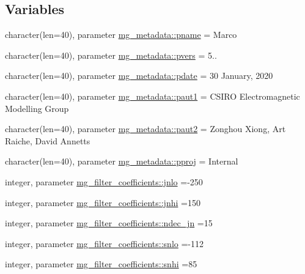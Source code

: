 \subsection*{Variables}
\begin{DoxyCompactItemize}
\item 
character(len=40), parameter \hyperlink{namespacemg__metadata_ad684795e52fbc1cdd49b371b212a9e80}{mg\+\_\+metadata\+::pname} = \textquotesingle{}Marco\textquotesingle{}
\item 
character(len=40), parameter \hyperlink{namespacemg__metadata_a12335b83f4d2c57e111fad11368698d3}{mg\+\_\+metadata\+::pvers} = \textquotesingle{}5..\textquotesingle{}
\item 
character(len=40), parameter \hyperlink{namespacemg__metadata_a4106e803f80dc8c6ab3c50695fb54f5d}{mg\+\_\+metadata\+::pdate} = \textquotesingle{}30 January, 2020\textquotesingle{}
\item 
character(len=40), parameter \hyperlink{namespacemg__metadata_a110dfe842cce52440d80ec88e87c5c17}{mg\+\_\+metadata\+::paut1} = \textquotesingle{}C\+S\+I\+RO Electromagnetic Modelling Group\textquotesingle{}
\item 
character(len=40), parameter \hyperlink{namespacemg__metadata_a57994bf5e2ca111728f864404d2819bd}{mg\+\_\+metadata\+::paut2} = \textquotesingle{}Zonghou Xiong, Art Raiche, David Annetts\textquotesingle{}
\item 
character(len=40), parameter \hyperlink{namespacemg__metadata_afefd0fba4ecb62a3ed3c8dcfd479c2d7}{mg\+\_\+metadata\+::pproj} = \textquotesingle{}Internal\textquotesingle{}
\item 
integer, parameter \hyperlink{namespacemg__filter__coefficients_a610240075eb5a7a6edf1336aceaa8a12}{mg\+\_\+filter\+\_\+coefficients\+::jnlo} =-\/250
\item 
integer, parameter \hyperlink{namespacemg__filter__coefficients_ae99157ef3b8edaa295b1a8230f9b118c}{mg\+\_\+filter\+\_\+coefficients\+::jnhi} =150
\item 
integer, parameter \hyperlink{namespacemg__filter__coefficients_ad58cefb64aa38c7129c2bcd9bacf4a90}{mg\+\_\+filter\+\_\+coefficients\+::ndec\+\_\+jn} =15
\item 
integer, parameter \hyperlink{namespacemg__filter__coefficients_a1600fb58e8eb22d762634b8fdf79e1e3}{mg\+\_\+filter\+\_\+coefficients\+::snlo} =-\/112
\item 
integer, parameter \hyperlink{namespacemg__filter__coefficients_a87a2b5c09b18d463bdad44275dda292a}{mg\+\_\+filter\+\_\+coefficients\+::snhi} =85

\end{DoxyCompactItemize}
